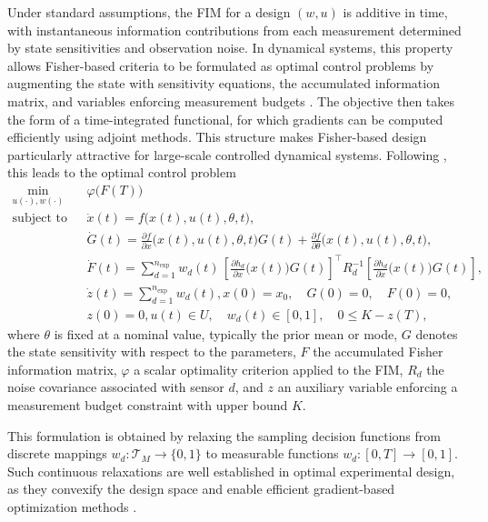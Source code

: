\documentclass[a4paper,11pt]{article}
\begin{document}
Under standard assumptions, the FIM for a design $(w,u)$ is additive in time, with instantaneous information contributions from each measurement determined by state sensitivities and observation noise. In dynamical systems, this property allows Fisher-based criteria to be formulated as optimal control problems by augmenting the state with sensitivity equations, the accumulated information matrix, and variables enforcing measurement budgets \cite{PronzatoPazman2013,WalterPronzato1997}. The objective then takes the form of a time-integrated functional, for which gradients can be computed efficiently using adjoint methods. This structure makes Fisher-based design particularly attractive for large-scale controlled dynamical systems. Following \cite{Sager2013}, this leads to the optimal control problem
\begin{equation} 
\begin{aligned} 
\min_{u(\cdot), w(\cdot)} \quad & \varphi\bigl(F(T)\bigr) \\
\text{subject to} \quad
& \dot x(t) = f\bigl(x(t),u(t),\theta,t\bigr), \\
& \dot{G}(t) = \frac{\partial f}{\partial x}\bigl(x(t), u(t), \theta, t\bigr) G(t)
               + \frac{\partial f}{\partial \theta}\bigl(x(t), u(t), \theta, t\bigr), \\
& \dot{F}(t) = \sum_{d=1}^{n_{\mathrm{exp}}}
w_d(t)\, \left[\frac{\partial h_d}{\partial x}\bigl(x(t)\bigr) G(t)\right]^\top
R_d ^{-1} \left[\frac{\partial h_d}{\partial x}\bigl(x(t)\bigr) G(t)\right], \\
& \dot{z}(t) = \sum_{d=1}^{n_{\mathrm{exp}}}w_d(t), 
x(0) = x_0, \quad G(0) = 0, \quad F(0) = 0, \\ 
& z(0) = 0, 
u(t) \in U, \quad w_d(t) \in [0,1], \quad
0 \le K - z(T), 
\end{aligned} \label{eq:fim_optimal_control}
\end{equation}
where $\theta$ is fixed at a nominal value, typically  the prior mean or mode, $G$ denotes the state sensitivity with respect to the parameters, $F$ the accumulated Fisher information matrix, $\varphi$ a scalar optimality criterion applied to the FIM, $R_d$ the noise covariance associated with sensor $d$, and $z$ an auxiliary variable enforcing a measurement budget constraint with upper bound $K$.


This formulation is obtained by relaxing the sampling decision functions from discrete mappings $w_d : \mathcal{T}_M \to \{0,1\}$ to measurable functions $w_d : [0,T] \to [0,1]$. Such continuous relaxations are well established in optimal experimental design, as they convexify the design space and enable efficient gradient-based optimization methods \cite{Kiefer2018}.
\end{document}
